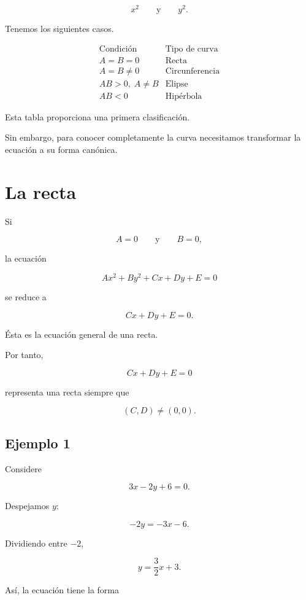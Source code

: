\documentclass[12pt]{article}
\theoremstyle{plain}
\theoremstyle{definition}
\theoremstyle{remark}
\begin{document}
{\[
x^2
\qquad\text{y}\qquad
y^2.
\]

Tenemos los siguientes casos.

\[
\boxed{
\begin{array}{c|c}
\text{Condición} & \text{Tipo de curva}\\
\hline
A=B=0 & \text{Recta}\\
A=B\neq0 & \text{Circunferencia}\\
AB>0,\;A\neq B & \text{Elipse}\\
AB<0 & \text{Hipérbola}
\end{array}
}
\]

Esta tabla proporciona una primera clasificación.

Sin embargo, para conocer completamente la curva necesitamos transformar
la ecuación a su forma canónica.

\section*{La recta}

Si

\[
A=0
\qquad\text{y}\qquad
B=0,
\]

la ecuación

\[
Ax^2+By^2+Cx+Dy+E=0
\]

se reduce a

\[
Cx+Dy+E=0.
\]

Ésta es la ecuación general de una recta.

Por tanto,

\[
\boxed{
Cx+Dy+E=0
}
\]

representa una recta siempre que

\[
(C,D)\neq(0,0).
\]

\subsection*{Ejemplo 1}

Considere

\[
3x-2y+6=0.
\]

Despejamos \(y\):

\[
-2y=-3x-6.
\]

Dividiendo entre \(-2\),

\[
y=\frac32x+3.
\]

Así, la ecuación tiene la forma

}
\end{document}

